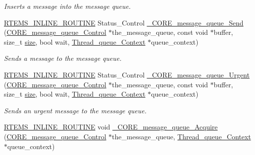 \begin{DoxyCompactItemize}
\begin{DoxyCompactList}\small\item\em Inserts a message into the message queue. \end{DoxyCompactList}\item 
\mbox{\hyperlink{group__RTEMSScoreBaseDefs_gac216239df231d5dbd15e3520b0b9313f}{R\+T\+E\+M\+S\+\_\+\+I\+N\+L\+I\+N\+E\+\_\+\+R\+O\+U\+T\+I\+NE}} Status\+\_\+\+Control \mbox{\hyperlink{group__RTEMSScoreMessageQueue_gac18a4d268009cbc9b85e28d680f31c9f}{\+\_\+\+C\+O\+R\+E\+\_\+message\+\_\+queue\+\_\+\+Send}} (\mbox{\hyperlink{structCORE__message__queue__Control}{C\+O\+R\+E\+\_\+message\+\_\+queue\+\_\+\+Control}} $\ast$the\+\_\+message\+\_\+queue, const void $\ast$buffer, size\+\_\+t \mbox{\hyperlink{sun4u_2tte_8h_a245260f6f74972558f61b85227df5aae}{size}}, bool wait, \mbox{\hyperlink{structThread__queue__Context}{Thread\+\_\+queue\+\_\+\+Context}} $\ast$queue\+\_\+context)
\begin{DoxyCompactList}\small\item\em Sends a message to the message queue. \end{DoxyCompactList}\item 
\mbox{\hyperlink{group__RTEMSScoreBaseDefs_gac216239df231d5dbd15e3520b0b9313f}{R\+T\+E\+M\+S\+\_\+\+I\+N\+L\+I\+N\+E\+\_\+\+R\+O\+U\+T\+I\+NE}} Status\+\_\+\+Control \mbox{\hyperlink{group__RTEMSScoreMessageQueue_ga323f421bffd8f2257e425617d6048077}{\+\_\+\+C\+O\+R\+E\+\_\+message\+\_\+queue\+\_\+\+Urgent}} (\mbox{\hyperlink{structCORE__message__queue__Control}{C\+O\+R\+E\+\_\+message\+\_\+queue\+\_\+\+Control}} $\ast$the\+\_\+message\+\_\+queue, const void $\ast$buffer, size\+\_\+t \mbox{\hyperlink{sun4u_2tte_8h_a245260f6f74972558f61b85227df5aae}{size}}, bool wait, \mbox{\hyperlink{structThread__queue__Context}{Thread\+\_\+queue\+\_\+\+Context}} $\ast$queue\+\_\+context)
\begin{DoxyCompactList}\small\item\em Sends an urgent message to the message queue. \end{DoxyCompactList}\item 
\mbox{\hyperlink{group__RTEMSScoreBaseDefs_gac216239df231d5dbd15e3520b0b9313f}{R\+T\+E\+M\+S\+\_\+\+I\+N\+L\+I\+N\+E\+\_\+\+R\+O\+U\+T\+I\+NE}} void \mbox{\hyperlink{group__RTEMSScoreMessageQueue_ga8b25ad850dd2b7eb4d3b752a4b231ac3}{\+\_\+\+C\+O\+R\+E\+\_\+message\+\_\+queue\+\_\+\+Acquire}} (\mbox{\hyperlink{structCORE__message__queue__Control}{C\+O\+R\+E\+\_\+message\+\_\+queue\+\_\+\+Control}} $\ast$the\+\_\+message\+\_\+queue, \mbox{\hyperlink{structThread__queue__Context}{Thread\+\_\+queue\+\_\+\+Context}} $\ast$queue\+\_\+context)

\end{DoxyCompactItemize}
